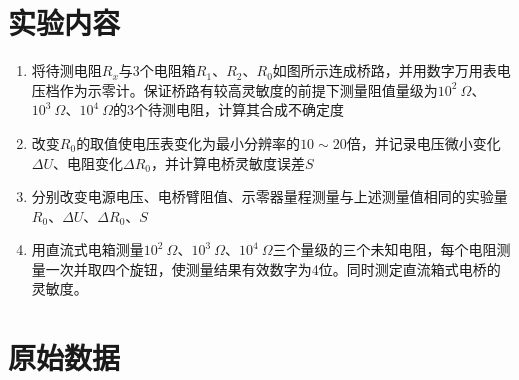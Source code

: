 \documentclass[UTF8]{ctexart}
\title{}
\author{}
\date{}
\begin{document}
\begin{titlepage}		
		
\end{titlepage}

\section{实验内容}
\begin{enumerate}
    \item 将待测电阻$R_x$与3个电阻箱$R_1$、$R_2$、$R_0$如图所示连成桥路，并用数字万用表电压档作为示零计。保证桥路有较高灵敏度的前提下测量阻值量级为$10^2 \ \Omega$、$10^3\ \Omega$、$10^4 \ \Omega$的3个待测电阻，计算其合成不确定度
    \item 改变$R_0$的取值使电压表变化为最小分辨率的$10 \sim 20$倍，并记录电压微小变化$\Delta U$、电阻变化$\Delta R_0$，并计算电桥灵敏度误差$S$
    \item 分别改变电源电压、电桥臂阻值、示零器量程测量与上述测量值相同的实验量$R_0$、$\Delta U$、$\Delta R_0$、$S$
    \item 用直流式电箱测量$10^2 \ \Omega$、$10^3 \ \Omega$、$10^4 \ \Omega$三个量级的三个未知电阻，每个电阻测量一次并取四个旋钮，使测量结果有效数字为4位。同时测定直流箱式电桥的灵敏度。
\end{enumerate}


\vspace{5cm}
\section{原始数据}
\end{document}
